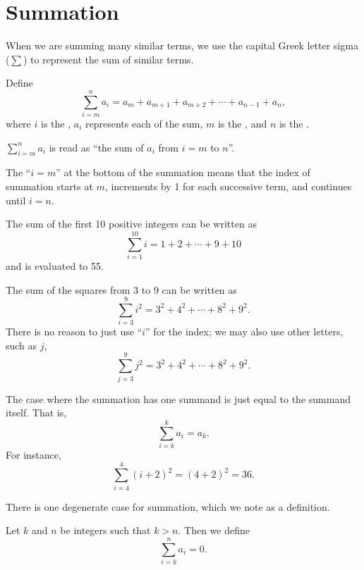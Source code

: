 \section{Summation}
When we are summing many similar terms, we use the capital Greek letter sigma ($\sum$) to represent the sum of similar terms.
\begin{definition}
    Define
    \[
        \sum_{i=m}^{n}a_i = a_m + a_{m+1} + a_{m+2} + \cdots + a_{n-1} + a_n,
    \]
    where $i$ is the , $a_i$ represents each  of the sum, $m$ is the , and $n$ is the .
\end{definition}
\begin{remark}
    $\displaystyle \sum_{i=m}^{n}a_i$ is read as ``the sum of $a_i$ from $i=m$ to $n$''.
\end{remark}
\begin{remark}
    The ``$i = m$'' at the bottom of the summation means that the index of summation starts at $m$, increments by 1 for each successive term, and continues until $i = n$.
\end{remark}

\begin{example}
    The sum of the first 10 positive integers can be written as
    \[
        \sum_{i=1}^{10}i = 1 + 2 + \cdots + 9 + 10
    \]
    and is evaluated to 55.
\end{example}

\begin{example}
    The sum of the squares from 3 to 9 can be written as
    \[
        \sum_{i=3}^{9}i^2 = 3^2 + 4^2 + \cdots + 8^2 + 9^2.
    \]
    There is no reason to just use ``$i$'' for the index; we may also use other letters, such as $j$,
    \[
        \sum_{j=3}^{9}j^2 = 3^2 + 4^2 + \cdots + 8^2 + 9^2.
    \]
\end{example}

\begin{example}
    The case where the summation has one summand is just equal to the summand itself. That is,
    \[
        \sum_{i=k}^{k}a_i = a_k.
    \]
    For instance,
    \[
        \sum_{i=4}^4(i+2)^2 = (4+2)^2 = 36.
    \]
\end{example}

There is one degenerate case for summation, which we note as a definition.
\begin{definition}
    Let $k$ and $n$ be integers such that $k > n$. Then we define
    \[
        \sum_{i=k}^{n}a_i = 0.
    \]
\end{definition}

